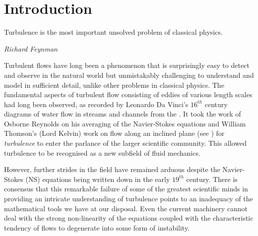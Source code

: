 
\chapter{Introduction}
\label{chap:introduction}


\epigraph{Turbulence is the most important unsolved problem of classical physics.}{\textit{Richard Feynman}}

Turbulent flows have long been a phenomenon that is surprisingly easy to detect and observe in the natural world but unmistakably challenging to understand and model in sufficient detail, unlike other problems in classical physics.
The fundamental aspects of turbulent flow consisting of eddies of various length scales had long been observed, as recorded by Leonardo Da Vinci's $16^{th}$ century diagrams of water flow in streams and channels from the  \parencite{Colagrossi2021DaVinci}.
It took the work of Osborne Reynolds on his averaging of the Navier-Stokes equations and William Thomson's (Lord Kelvin) work on flow along an inclined plane (see ) for \textit{turbulence} to enter the parlance of the larger scientific community. This allowed turbulence to be recognised as a new subfield of fluid mechanics.

However, further strides in the field have remained arduous despite the Navier-Stokes (NS) equations being written down in the early $19^{th}$ century. There is consensus that this remarkable failure of some of the greatest scientific minds in providing an intricate understanding of turbulence points to an inadequacy of the mathematical tools we have at our disposal. Even the current machinery cannot deal with the strong non-linearity of the equations coupled with the characteristic tendency of flows to degenerate into some form of instability.


